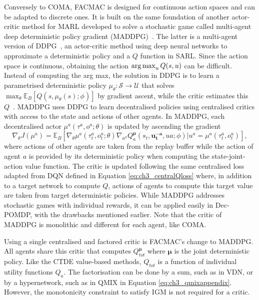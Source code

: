 Conversely to COMA, FACMAC is designed for continuous action spaces and can be adapted to discrete ones.
It is built on the same foundation of another actor-critic method for MARL developed to solve a stochastic game called multi-agent deep deterministic policy gradient (MADDPG)~\citep{lowe2017multi}.
The latter is a multi-agent version of DDPG~\citep{lillicrap2015continuous}, an actor-critic method using deep neural networks to approximate a deterministic policy and a $Q$ function in SARL.
Since the action space is continuous, obtaining the action $\operatorname*{arg\,max}_u Q(s, u)$ can be difficult.
Instead of computing the arg max, the solution in DDPG is to learn a parametrised deterministic policy $\mu_\theta:\mathcal{S}\rightarrow\mathcal{U}$ that solves $\max_\theta \mathbb{E}_B[Q(s, \mu_\theta(s); \phi)]$ by gradient ascent, while the critic estimates this $Q$~\citep{silver2014deterministic}.
MADDPG uses DDPG to learn decentralised policies using centralised critics with access to the state and actions of other agents.
In MADDPG, each decentralised actor $\mu^a(\tau^a, o^a;\theta)$ is updated by ascending the gradient
\begin{equation}
\label{eq:ch3_maddpg_grad}
    \nabla_\theta J(\mu^a) = \mathbb{E}_B\left[\nabla_{\theta} \mu^a(\tau_t^a, o_t^a;\theta) \nabla_{u^a} Q_a^{\mathbf{\mu}}(s_t, \mathbf{u_t^{-a}}, u a; \phi)|u^a=\mu^a(\tau_t^a, o_t^a)\right],
\end{equation}
where actions of other agents are taken from the replay buffer while the action of agent $a$ is provided by its deterministic policy when computing the state-joint-action value function.
The critic is updated following the same centralised loss adapted from DQN defined in Equation \ref{eq:ch3_centralQloss} where, in addition to a target network to compute $Q$, actions of agents to compute this target value are taken from target deterministic policies.
While MADDPG addresses stochastic games with individual rewards, it can be applied easily in Dec-POMDP, with the drawbacks mentioned earlier.
Note that the critic of MADDPG is monolithic and different for each agent, like COMA.

Using a single centralised and factored critic is FACMAC's change to MADDPG.
All agents share this critic that computes $Q_{tot}^{\mathbf{\mu}}$ where $\mathbf{\mu}$ is the joint deterministic policy.
Like the CTDE value-based methods, $Q_{tot}$ is a function of individual utility functions $Q_a$.
The factorisation can be done by a sum, such as in VDN, or by a hypernetwork, such as in QMIX in Equation \ref{eq:ch3_qmixappendix}.
However, the monotonicity constraint to satisfy IGM is not required for a critic.

